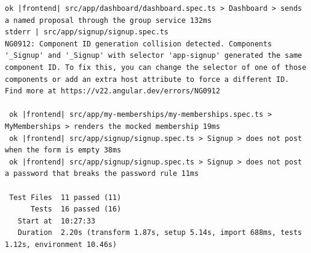 \documentclass[10pt,a4paper]{article}
\begin{document}
\begin{Verbatim}[fontsize=\scriptsize,breaklines,frame=single]
 ok |frontend| src/app/dashboard/dashboard.spec.ts > Dashboard > sends a named proposal through the group service 132ms
stderr | src/app/signup/signup.spec.ts
NG0912: Component ID generation collision detected. Components '_Signup' and '_Signup' with selector 'app-signup' generated the same component ID. To fix this, you can change the selector of one of those components or add an extra host attribute to force a different ID. Find more at https://v22.angular.dev/errors/NG0912

 ok |frontend| src/app/my-memberships/my-memberships.spec.ts > MyMemberships > renders the mocked membership 19ms
 ok |frontend| src/app/signup/signup.spec.ts > Signup > does not post when the form is empty 38ms
 ok |frontend| src/app/signup/signup.spec.ts > Signup > does not post a password that breaks the password rule 11ms

 Test Files  11 passed (11)
      Tests  16 passed (16)
   Start at  10:27:33
   Duration  2.20s (transform 1.87s, setup 5.14s, import 688ms, tests 1.12s, environment 10.46s)
\end{Verbatim}
\end{document}

